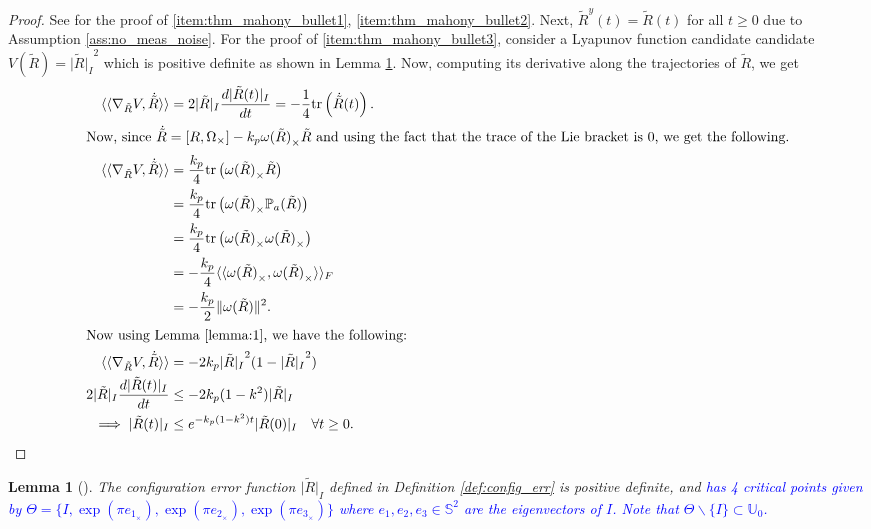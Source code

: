\documentclass{article}
\newtheorem{lemma}{Lemma}
\newcommand{\trace}[1]{\text{tr}\left(#1\right)}
\newcommand{\textblue}[1]{\textcolor{blue}{#1}}
\newcommand{\Rtilde}{\tilde{R}}
\newcommand{\normSOthree}[1]{{{\vert}#1 {\vert}_I}}
\newcommand{\expo}[1]{e^{#1}}
\newcommand{\frobenius}[2]{\langle\langle #1, #2\rangle\rangle_F}
\newcommand{\dualpairing}[2]{\langle\langle #1 , #2 \rangle\rangle}
\newcommand{\grad}[2]{\nabla_{#1}{#2}}
\begin{document}
\begin{proof}
    See {\cite[Theorem 4.2]{mahony_complementaryFilter}} for the proof of \ref{item:thm_mahony_bullet1}, \ref{item:thm_mahony_bullet2}. Next, $\Rtilde^y(t) = \Rtilde(t)$ for all $t\geq 0$ due to Assumption \ref{ass:no_meas_noise}. For the proof of \ref{item:thm_mahony_bullet3}, consider a Lyapunov function candidate candidate $V(\Rtilde) = \normSOthree{\Rtilde}^2$ which is positive definite as shown in Lemma \ref{lemma:lyapfunc}. Now, computing its derivative along the trajectories of $\Rtilde$, we get 
    \begin{align*}
        \dualpairing{\grad{\Rtilde}{V}}{\dot{\Rtilde}} &= 2\normSOthree{\Rtilde}\frac{d \normSOthree{\Rtilde(t)}}{dt} = -\frac{1}{4}\trace{\dot{\Rtilde}(t)}.\\
        \intertext{Now, since $\dot{\Rtilde} = [R, \Omega_\times] - k_p{\omega(\Rtilde)}_\times\Rtilde$ and using the fact that the trace of the Lie bracket is $0$, we get the following.}
        \dualpairing{\grad{\Rtilde}{V}}{\dot{\Rtilde}} &= \frac{k_p}{4}\trace{{{\omega(\Rtilde)}_\times}\Rtilde}\\
        &= \frac{k_p}{4}\trace{{\omega(\Rtilde)}_\times \mathbb{P}_a{(\Rtilde)}}\\
        &= \frac{k_p}{4}\trace{{\omega(\Rtilde)}_\times {\omega(\Rtilde)}_\times}\\
        &= -\frac{k_p}{4}\frobenius{{\omega(\Rtilde)}_\times}{{\omega(\Rtilde)}_\times}\\
        &= -\frac{k_p}{2}\|\omega(\Rtilde)\|^2.\\
        \intertext{Now using Lemma \ref{lemma:1}, we have the following:}
        \dualpairing{\grad{\Rtilde}{V}}{\dot{\Rtilde}}  &= -2k_p\normSOthree{\Rtilde}^2(1-\normSOthree{\Rtilde}^2)\\
        2\normSOthree{\Rtilde}\frac{d\normSOthree{\Rtilde(t)}}{dt}&\leq -2k_p(1-k^2)\normSOthree{\Rtilde}\\ 
        \implies \normSOthree{\Rtilde(t)} &\leq \expo{-k_p(1-k^2)t}\normSOthree{\Rtilde(0)} \quad \forall t\geq 0.
    \end{align*}
\end{proof}

\begin{lemma}[\textblue{{\cite[Lemma 5.6]{Chillingworth}}}] \label{lemma:lyapfunc}
    The configuration error function $\normSOthree{\Rtilde}$ defined in Definition \ref{def:config_err} is positive definite, and \textblue{has 4 critical points given by $\Theta =  \{I, \exp(\pi e_{1_{\times}}),  \exp(\pi e_{2_{\times}}), \exp(\pi e_{3_{\times}})\}$ where $e_1, e_2, e_3 \in \mathbb{S}^2$ are the eigenvectors of $I$. Note that $\Theta\backslash\{I\}\subset \mathbb{U}_0$. }
\end{lemma}
\end{document}
